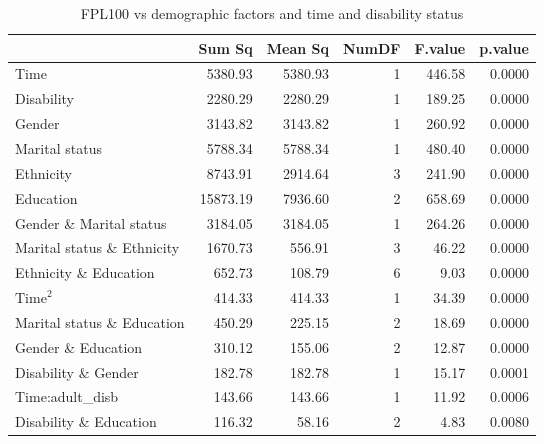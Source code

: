 \begin{table}[H]
\footnotesize
\centering
\caption{FPL100 vs demographic factors and time and disability status} 
\begin{tabular}{lrrrrr}
  \hline
  & Sum Sq & Mean Sq & NumDF & F.value & p.value \\ 
  \hline
  Time & 5380.93 & 5380.93 & 1 & 446.58 & 0.0000 \\ 
  Disability & 2280.29 & 2280.29 & 1 & 189.25 & 0.0000 \\ 
  Gender & 3143.82 & 3143.82 & 1 & 260.92 & 0.0000 \\ 
  Marital status & 5788.34 & 5788.34 & 1 & 480.40 & 0.0000 \\ 
  Ethnicity & 8743.91 & 2914.64 & 3 & 241.90 & 0.0000 \\ 
  Education & 15873.19 & 7936.60 & 2 & 658.69 & 0.0000 \\ 
  Gender \& Marital status & 3184.05 & 3184.05 & 1 & 264.26 & 0.0000 \\ 
  Marital status \& Ethnicity & 1670.73 & 556.91 & 3 & 46.22 & 0.0000 \\ 
  Ethnicity \& Education & 652.73 & 108.79 & 6 & 9.03 & 0.0000 \\ 
  $\text{Time}^2$ & 414.33 & 414.33 & 1 & 34.39 & 0.0000 \\ 
  Marital status \& Education & 450.29 & 225.15 & 2 & 18.69 & 0.0000 \\ 
  Gender \& Education & 310.12 & 155.06 & 2 & 12.87 & 0.0000 \\ 
  Disability \& Gender & 182.78 & 182.78 & 1 & 15.17 & 0.0001 \\ 
  Time:adult\_disb & 143.66 & 143.66 & 1 & 11.92 & 0.0006 \\ 
  Disability \& Education & 116.32 & 58.16 & 2 & 4.83 & 0.0080 \\ 
   \hline
\end{tabular}
\label{tab:Anova1}
\end{table}


